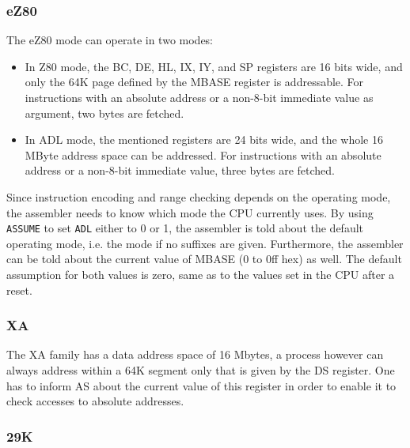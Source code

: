 \documentclass[12pt,twoside]{report}
\newcommand{\asname}{{AS}}
\begin{document}

\subsubsection{eZ80}

The eZ80 mode can operate in two modes:
\begin{itemize}
\item{In Z80 mode, the BC, DE, HL, IX, IY, and SP registers are 16 bits wide,
      and only the 64K page defined by the MBASE register is addressable.
      For instructions with an absolute address or a non-8-bit immediate value
      as argument, two bytes are fetched.}
\item{In ADL mode, the mentioned registers are 24 bits wide, and the whole
      16 MByte address space can be addressed.  For instructions with an absolute
      address or a non-8-bit immediate value, three bytes are fetched.}
\end{itemize}
Since instruction encoding and range checking depends on the operating mode,
the assembler needs to know which mode the CPU currently uses.  By using
{\tt ASSUME} to set {\tt ADL} either to 0 or 1, the assembler is told about
the default operating mode, i.e. the mode if no suffixes are given.  Furthermore,
the assembler can be told about the current value of MBASE (0 to 0ff hex) as
well.  The default assumption for both values is zero, same as to the values
set in the CPU after a reset.


\subsubsection{XA}

The XA family has a data address space of 16 Mbytes, a process however
can always address within a 64K segment only that is given by the DS
register.  One has to inform \asname{} about the current value of this
register in order to enable it to check accesses to absolute
addresses.


\subsubsection{29K}
\end{document}
